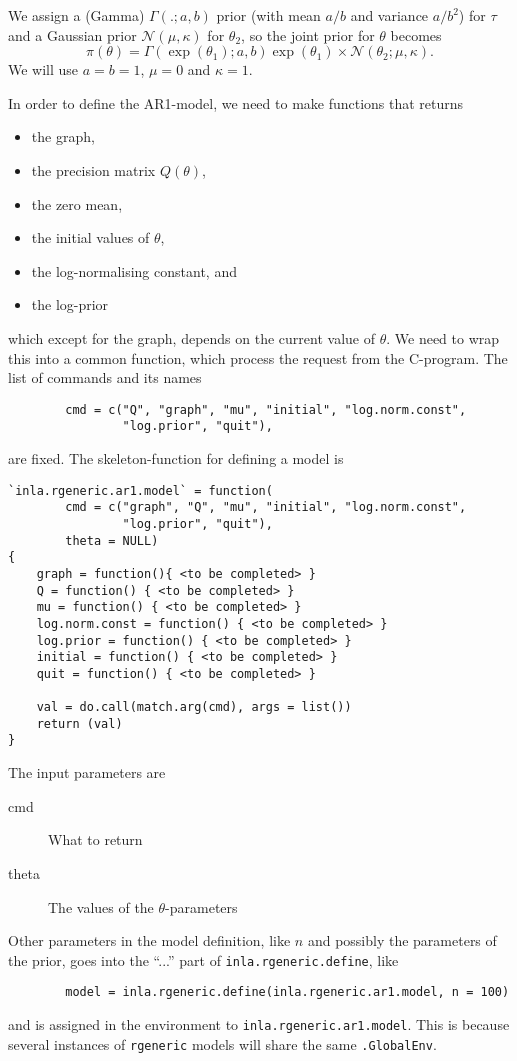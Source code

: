 \documentclass[a4paper,11pt]{article}
\begin{document}
We assign a (Gamma) $\Gamma(.; a,b)$ prior (with mean $a/b$ and
variance $a/b^{2}$) for $\tau$ and a Gaussian prior
${\mathcal N}(\mu,\kappa)$ for $\theta_{2}$, so the joint prior for
$\theta$ becomes
\begin{displaymath}
    \pi(\theta) = \Gamma(\exp(\theta_1); a,b) \exp(\theta_1) \times
    {\mathcal N}(\theta_{2}; \mu, \kappa).
\end{displaymath}
We will use $a=b=1$, $\mu=0$ and $\kappa=1$.

In order to define the AR1-model, we need to make functions that
returns
\begin{itemize}
\item the graph,
\item the precision matrix $Q(\theta)$,
\item the zero mean,
\item the initial values of $\theta$,
\item the log-normalising constant, and
\item the log-prior
\end{itemize}
which except for the graph, depends on the current value of
$\theta$. We need to wrap this into a common function, which process
the request from the C-program. The list of commands and its names
{\small
\begin{verbatim}
        cmd = c("Q", "graph", "mu", "initial", "log.norm.const",
                "log.prior", "quit"),
\end{verbatim}}
are fixed.  The skeleton-function for defining a model is 
{\small
\begin{verbatim}
`inla.rgeneric.ar1.model` = function(
        cmd = c("graph", "Q", "mu", "initial", "log.norm.const",
                "log.prior", "quit"),
        theta = NULL)
{
    graph = function(){ <to be completed> }
    Q = function() { <to be completed> }
    mu = function() { <to be completed> }
    log.norm.const = function() { <to be completed> }
    log.prior = function() { <to be completed> }
    initial = function() { <to be completed> }
    quit = function() { <to be completed> }

    val = do.call(match.arg(cmd), args = list())
    return (val)
}
\end{verbatim}
}
The input parameters are
\begin{description}
\item[cmd] What to return
\item[theta] The values of the $\theta$-parameters
\end{description}
Other parameters in the model definition, like $n$ and possibly the
parameters of the prior, goes into the ``...'' part of
\texttt{inla.rgeneric.define}, like
\begin{verbatim}
        model = inla.rgeneric.define(inla.rgeneric.ar1.model, n = 100)
\end{verbatim}
and is assigned in the environment to
\texttt{inla.rgeneric.ar1.model}. This is because several instances of
\texttt{rgeneric} models will share the same \texttt{.GlobalEnv}.
\end{document}
